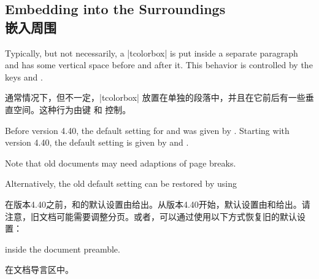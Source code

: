 \setcounter{section}{4}
\setcounter{subsection}{13}
\setcounter{subsubsection}{0}%

\subsection{Embedding into the Surroundings\\嵌入周围}\label{subsec:surroundings}

Typically, but not necessarily, a |tcolorbox| is put inside a separate paragraph and has some vertical space before and after it.
This behavior is controlled by the keys  and .

通常情况下，但不一定，|tcolorbox| 放置在单独的段落中，并且在它前后有一些垂直空间。这种行为由键  和  控制。


\begin{marker}
Before version 4.40, the default setting for 
and  was given by .
Starting with version 4.40, the default setting is given by
 and .\par
Note that old documents may need adaptions of page breaks.\par
Alternatively, the old default setting can be restored by using


在版本4.40之前，和的默认设置由给出。从版本4.40开始，默认设置由和给出。请注意，旧文档可能需要调整分页。或者，可以通过使用以下方式恢复旧的默认设置：
\begin{dispListing}
\end{dispListing}
inside the document preamble.

在文档导言区中。
\end{marker}

